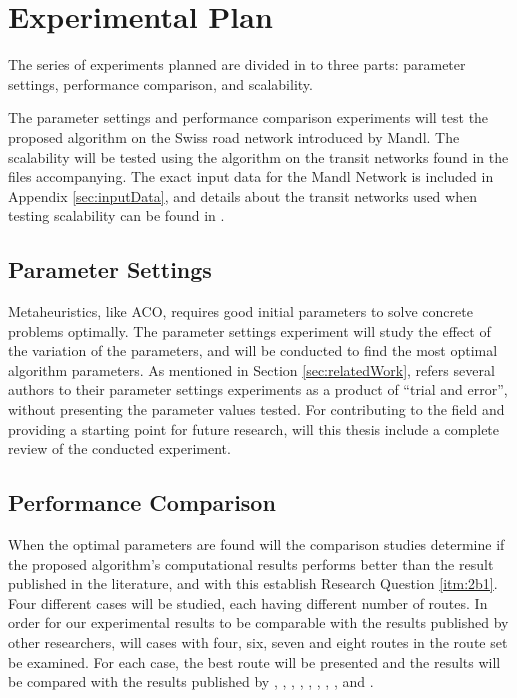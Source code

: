 \section{Experimental Plan}
\label{sec:expPlan}
The series of experiments planned are divided in to three parts: parameter settings, performance comparison, and scalability.

The parameter settings and performance comparison experiments will test the proposed algorithm on the Swiss road network introduced by Mandl\citep{mandl79}. The scalability will be tested using the algorithm on the transit networks found in the files accompanying\citet{mumford13}. The exact input data for the Mandl Network is included in Appendix \vref{sec:inputData}, and details about the transit networks used when testing scalability can be found in \citet{mumford13}.

\subsection{Parameter Settings}
Metaheuristics, like ACO, requires good initial parameters to solve concrete problems optimally. The parameter settings experiment will study the effect of the variation of the parameters, and will be conducted to find the most optimal algorithm parameters. As mentioned in Section \vref{sec:relatedWork}, refers several authors to their parameter settings experiments as a product of ``trial and error'', without presenting the parameter values tested. For contributing to the field and providing a starting point for future research, will this thesis include a complete review of the conducted experiment. %

\subsection{Performance Comparison}
When the optimal parameters are found will the comparison studies determine if the proposed algorithm's computational results performs better than the result published in the literature, and with this establish Research Question \ref{itm:2b1}. Four different cases will be studied, each having different number of routes. In order for our experimental results to be comparable with the results published by other researchers, will cases with four, six, seven and eight routes in the route set be examined. For each case, the best route will be presented and the results will be compared with the results published by \citet{mandl79}, \citet{kechagiopoulos14}, \citet{nikolic14}, \citet{kidwai98}, \citet{fan10}, \citet{chakroborty02}, \citet{zhang10}, \citet{chew12}, and \citet{baaj91}.

